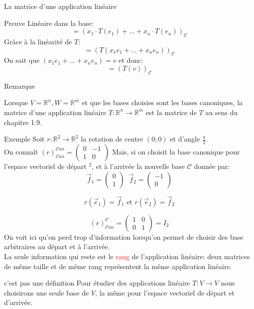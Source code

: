 \begin{parag}{La matrice d'une application linéaire}
\begin{subparag}{Preuve}
        Linéaire dans la base:
        \[= \left(x_1\cdot T\left(e_1\right) + \dots + x_n \cdot T\left(e_n\right)\right)_{\mathcal{C}}\]
        Grâce à la linéarité de $T$:
        \[= \left(T\left(x_1 e_1 + \dots + x_n e_n \right) \right)_{\mathcal{C}}\]
        On sait que $\left(x_1 e_1 + \dots + x_n e_n \right)  = v$ et donc:
\[ = \left(T\left(v\right)\right)_{\mathcal{C}}\]
    \end{subparag}
    \begin{subparag}{Remarque}
    \begin{framedremark}
        Lorsque $V = \mathbb{R}^n, W = \mathbb{R}^m$ et que les bases choisies sont les bases canoniques, la matrice d'une application linéaire $T : \mathbb{R}^n \to \mathbb{R}^m$ est la matrice de $T$ au sens du chapitre 1.9.
    \end{framedremark}
        
    \end{subparag}

    \begin{subparag}{Exemple}
        Soit $r : \mathbb{R}^2 \to \mathbb{R}^2$ la rotation de centre $\left(0;0\right)$ et d'angle $\frac{\pi}{2}$.\\
        On connaît $\left(r\right)_{\mathcal{C}an}^{\mathcal{C}an} = \begin{pmatrix}
            0 & -1 \\ 1 & 0
        \end{pmatrix}$
        Mais, si on choisit la base canonique pour l’espace vectoriel de départ \R$^2$, et à l'arrivée la nouvelle base $\mathcal{C}$ donnée par:
        \[\vec{f}_1 = \begin{pmatrix}
            0 \\ 1
        \end{pmatrix} \; \; \vec{f}_2 = \begin{pmatrix}
            -1 \\ 0
        \end{pmatrix}\]
        \begin{formule}
            \[r\left(\vec{e}_1\right) = \vec{f}_1 \text{ et } r\left( \vec{e}_2\right) = \vec{f}_2\]
        \end{formule}
        \[\left(r\right)_{\mathcal{C}an}^{\mathcal{C}} = \begin{pmatrix}
            1 & 0 \\ 0 & 1
        \end{pmatrix} = I_2\]
        On voit ici qu'on perd trop d'information lorsqu'on permet de choisir des base arbitraires au départ et à l'arrivée. 
        \\
        La seule information qui reste est le \textcolor{red}{rang} de l'application linéaire: deux matrices de même taille et de même rang représentent la même application linéaire.
        \begin{definition}{c'est pas une définition}
            Pour étudier des applications linéaire $T: V \to V$ nous choisirons une seule base de $V$, la même pour l'espace vectoriel de départ et d'arrivée.
        \end{definition}
    \end{subparag}
    

\end{parag}
